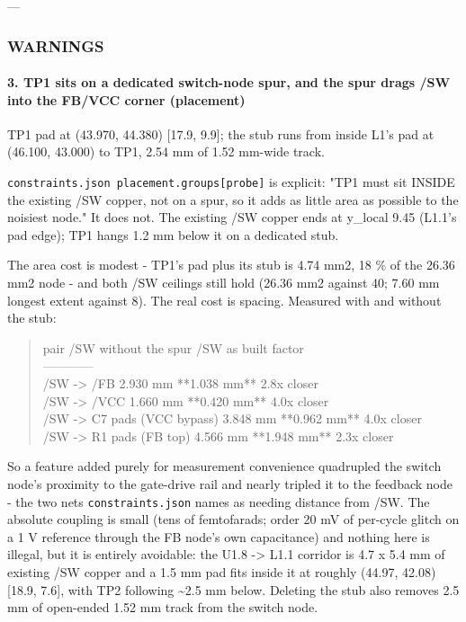 \documentclass[11pt,a4paper]{article}
\begin{document}
---

\subsubsection*{WARNINGS}
\paragraph*{3. TP1 sits on a dedicated switch-node spur, and the spur drags /SW into the FB/VCC corner (placement)}
TP1 pad at (43.970, 44.380) {[}17.9, 9.9{]}; the stub runs from inside L1's pad at (46.100, 43.000) to TP1, 2.54 mm of 1.52 mm-wide track.

\texttt{constraints.json placement.groups{[}probe{]}} is explicit: "TP1 must sit INSIDE the existing /SW copper, not on a spur, so it adds as little area as possible to the noisiest node." It does not. The existing /SW copper ends at y\_local 9.45 (L1.1's pad edge); TP1 hangs 1.2 mm below it on a dedicated stub.

The area cost is modest - TP1's pad plus its stub is 4.74 mm2, 18 \% of the 26.36 mm2 node - and both /SW ceilings still hold (26.36 mm2 against 40; 7.60 mm longest extent against 8). The real cost is spacing. Measured with and without the stub:

\begin{quote}\small\ttfamily\raggedright
\textbar{} pair \textbar{} /SW without the spur \textbar{} /SW as built \textbar{} factor \textbar{}\\
\textbar{}---\textbar{}---\textbar{}---\textbar{}---\textbar{}\\
\textbar{} /SW -\textgreater{} /FB \textbar{} 2.930 mm \textbar{} {*}{*}1.038 mm{*}{*} \textbar{} 2.8x closer \textbar{}\\
\textbar{} /SW -\textgreater{} /VCC \textbar{} 1.660 mm \textbar{} {*}{*}0.420 mm{*}{*} \textbar{} 4.0x closer \textbar{}\\
\textbar{} /SW -\textgreater{} C7 pads (VCC bypass) \textbar{} 3.848 mm \textbar{} {*}{*}0.962 mm{*}{*} \textbar{} 4.0x closer \textbar{}\\
\textbar{} /SW -\textgreater{} R1 pads (FB top) \textbar{} 4.566 mm \textbar{} {*}{*}1.948 mm{*}{*} \textbar{} 2.3x closer \textbar{}
\end{quote}
So a feature added purely for measurement convenience quadrupled the switch node's proximity to the gate-drive rail and nearly tripled it to the feedback node - the two nets \texttt{constraints.json} names as needing distance from /SW. The absolute coupling is small (tens of femtofarads; order 20 mV of per-cycle glitch on a 1 V reference through the FB node's own capacitance) and nothing here is illegal, but it is entirely avoidable: the U1.8 -\textgreater{} L1.1 corridor is 4.7 x 5.4 mm of existing /SW copper and a 1.5 mm pad fits inside it at roughly (44.97, 42.08) {[}18.9, 7.6{]}, with TP2 following \textasciitilde{}2.5 mm below. Deleting the stub also removes 2.5 mm of open-ended 1.52 mm track from the switch node.
\end{document}
